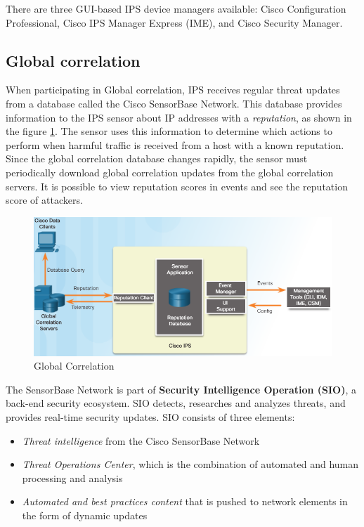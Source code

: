 There are three GUI-based IPS device managers available: Cisco Configuration Professional, Cisco IPS Manager Express (IME), and Cisco Security Manager.

\subsection{Global correlation}
 
When participating in Global correlation, IPS receives regular threat updates from a database called the Cisco SensorBase Network. This database provides information to the IPS sensor about IP addresses with a \emph{reputation}, as shown in the figure \ref{GlobalCorrelation}. The sensor uses this information to determine which actions to perform when harmful traffic is received from a host with a known reputation. Since the global correlation database changes rapidly, the sensor must periodically download global correlation updates from the global correlation servers. It is possible to view reputation scores in events and see the reputation score of attackers.\\

\begin{figure}[hbtp]
\caption{Global Correlation}\label{GlobalCorrelation}
\centering
\includegraphics[scale=0.5]{pictures/GlobalCorrelation.PNG}
\end{figure}



The SensorBase Network is part of \textbf{Security Intelligence Operation (SIO)}, a back-end security ecosystem. SIO detects, researches and analyzes threats, and provides real-time security updates. SIO consists of three elements:

\begin{itemize}
\item \emph{Threat intelligence} from the Cisco SensorBase Network
\item \emph{Threat Operations Center}, which is the combination of automated and human processing and analysis
\item \emph{Automated and best practices content} that is pushed to network elements in the form of dynamic updates
\end{itemize}

